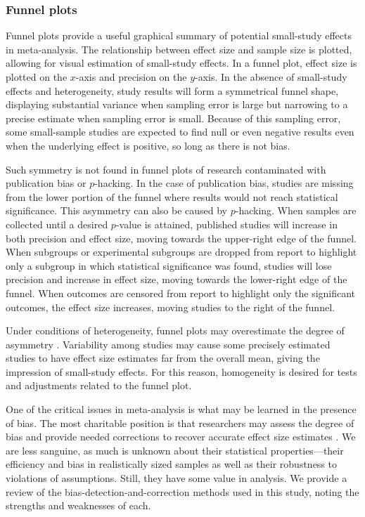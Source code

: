 \documentclass[man, mask]{apa6}
\begin{document}
\subsubsection{Funnel plots}
Funnel plots provide a useful graphical summary of potential small-study effects in meta-analysis.  The relationship between effect size and sample size is plotted, allowing for visual estimation of small-study effects. In a funnel plot, effect size is plotted on the $x$-axis and precision on the $y$-axis. In the absence of small-study effects and heterogeneity, study results will form a symmetrical funnel shape, displaying substantial variance when sampling error is large but narrowing to a precise estimate when sampling error is small. Because of this sampling error, some small-sample studies are expected to find null or even negative results even when the underlying effect is positive, so long as there is not bias. 

Such symmetry is not found in funnel plots of research contaminated with publication bias or $p$-hacking.  In the case of publication bias, studies are missing from the lower portion of the funnel where results would not reach statistical significance. This asymmetry can also be caused by $p$-hacking. When samples are collected until a desired $p$-value is attained, published studies will increase in both precision and effect size, moving towards the upper-right edge of the funnel. When subgroups or experimental subgroups are dropped from report to highlight only a subgroup in which statistical significance was found, studies will lose precision and increase in effect size, moving towards the lower-right edge of the funnel. When outcomes are censored from report to highlight only the significant outcomes, the effect size increases, moving studies to the right of the funnel. 

Under conditions of heterogeneity, funnel plots may overestimate the degree of asymmetry \citep{Lau:etal:2006,Terrin:etal:2003}. Variability among studies may cause some precisely estimated studies to have effect size estimates far from the overall mean, giving the impression of small-study effects. For this reason, homogeneity is desired for tests and adjustments related to the funnel plot.

One of the critical issues in meta-analysis is what may be learned in the presence of bias. The most charitable position is that researchers may assess the degree of bias and provide needed corrections to recover accurate effect size estimates \citep[e.g.,][]{Duval:Tweedie:2000,Simonsohn:etal:2014b}.  We are less sanguine, as much is unknown about their statistical properties---their efficiency and bias in realistically sized samples as well as their robustness to violations of assumptions.  Still, they have some value in analysis. We provide a review of the bias-detection-and-correction methods used in this study, noting the strengths and weaknesses of each. 
\end{document}
